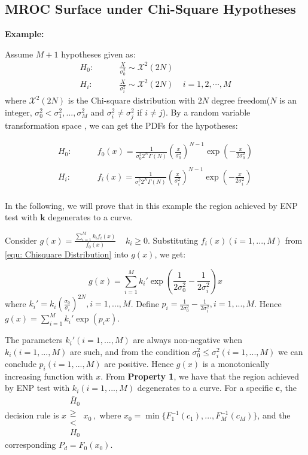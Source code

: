 \subsection{MROC Surface under Chi-Square Hypotheses}
\noindent\textbf{Example:}

Assume $M+1$ hypotheses  given as:
\begin{equation}
  \label{equ: Chisquare Hypothesis}
  \begin{split}
    H_0:\;\;\;\;\;\;\;\;&\frac{X}{\sigma_0^2} \sim \mathcal{X}^2(2N)\\
    H_i:\;\;\;\;\;\;\;\;&\frac{X}{\sigma_i^2} \sim \mathcal{X}^2(2N)\;\;\;\;i=1, 2, \cdots, M
  \end{split}
\end{equation}
where $\mathcal{X}^2(2N)$ is the Chi-square distribution with  $2N$ degree freedom($N$ is an integer, $\sigma_0^2 < \sigma_1^2, ..., \sigma_M^2$ and $\sigma_i^2 \neq \sigma_j^2$ if $i \neq j$). By a random variable transformation space \cite{mark2011probability}, we can get the PDFs for the hypotheses:

\def \CHISQU[#1]{\frac{1}{#1 2^N\Gamma(N)}\left(\frac{x}{#1}\right)^{N-1}\exp\left(-\frac{x}{2#1}\right)\\}
\begin{equation}
  \label{equ: Chisquare Distribution}
  \begin{split}
    H_0:\;\;\;\;\;\;\;\;&f_0(x) = \CHISQU[\sigma_0^2]\\
    H_i:\;\;\;\;\;\;\;\;&f_i(x) = \CHISQU[\sigma_i^2]
  \end{split}
\end{equation}

In the following, we will prove that in this example the region achieved by ENP test with $\mathbf{k}$ degenerates to a curve.

Consider
 $ g(x) = \frac{\sum_{i=1}^{M}k_if_i(x)}{f_0(x)} \;\;\;\;k_i \geq 0$. 
Substituting $f_i(x) (i=1, ..., M)$ from \eqref{equ: Chisquare Distribution} into $g(x)$, we get:

\begin{equation}
  \label{equ: decision rule chi 1}
g(x) = \sum_{i=1}^{M}k_i'\exp{(\frac{1}{2\sigma_0^2} - \frac{1}{2\sigma_i^2})x} 
\end{equation}
where $k_i' = k_i(\frac{\sigma_0}{\sigma_i})^{2N}, i= 1, ..., M$. Define $p_i = \frac{1}{2\sigma_0^2} - \frac{1}{2\sigma_i^2}, i=1, ..., M$. Hence $g(x) =  \sum_{i=1}^{M}k_i'\exp{(p_ix)}$.

The parameters $k_i' (i=1, ..., M)$ are always non-negative when $k_i (i=1, ..., M)$ are such, and from 
 the condition $\sigma_0^2 \leq \sigma_i^2 (i=1, ..., M)$ we can conclude $p_i (i=1, ..., M)$ are positive. Hence $g(x)$ is a monotonically increasing function with $x$. From \textbf{Property 1}, we have that the region achieved by ENP test with $k_i (i = 1, ..., M)$ degenerates to a curve. For a specific $\mathbf{c}$, the decision rule is 
$  x \substack{\bar{H}_0 \\ \geq \\ < \\ H_0} x_0\,,$
where $x_0 = \min\{F_1^{-1}(c_1), ..., F_M^{-1}(c_M)\}$,
and the corresponding $P_d = F_0(x_0)$. 

